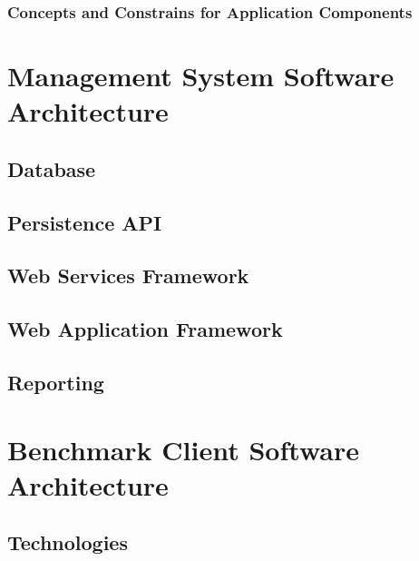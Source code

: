 \documentclass[11pt,a4paper]{report}
\begin{document}
\subsection{Concepts and Constrains for Application Components}

\chapter{Management System Software Architecture}
\section{Database}


\section{Persistence API}


\section{Web Services Framework}


\section{Web Application Framework}


\section{Reporting}


\chapter{Benchmark Client Software Architecture}
	
\section{Technologies}

\end{document}
